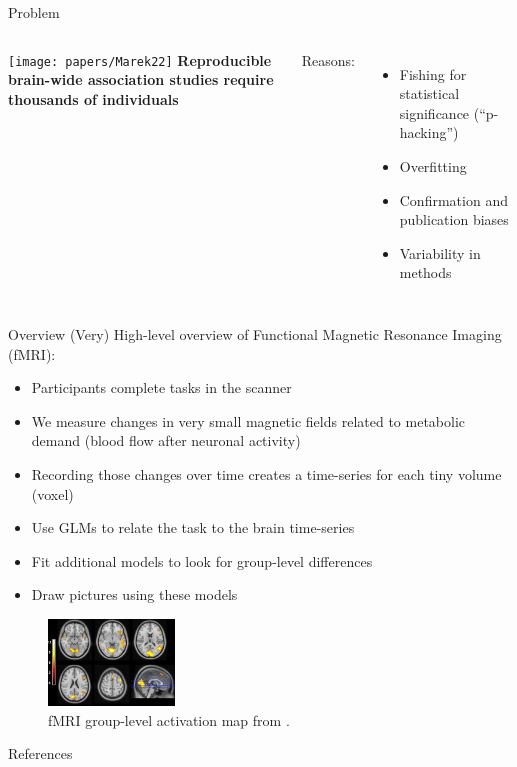 \documentclass[aspectratio=169]{beamer}
\begin{document}
\begin{frame}{Problem}
	\begin{columns}
		\texttt{[image: papers/Marek22]}
		\textbf{Reproducible brain-wide association studies require thousands of individuals \cite{MarekEtAl2022}}
		
		Reasons:
		\begin{itemize}
			\item Fishing for statistical significance (``p-hacking'') \cite{Nuzzo}
			\item Overfitting \cite{Hawkins2004}
			\item Confirmation and publication biases \cite{Bishop2020}
			\item Variability in methods \cite{Botvinik-NezerEtAl2020}
		\end{itemize}
	\end{columns}
\end{frame}


\begin{frame}{Overview}
		(Very) High-level overview of Functional Magnetic Resonance Imaging (fMRI):
		
		\begin{itemize}
			\item Participants complete tasks in the scanner
			\item We measure changes in very small magnetic fields related to metabolic demand (blood flow after neuronal activity)
			\item Recording those changes over time creates a time-series for each tiny volume (voxel)
			\item Use GLMs to relate the task to the brain time-series
			\item Fit additional models to look for group-level differences
			\item Draw pictures using these models
		\end{itemize}
		
		\begin{figure}
				\includegraphics[width=0.3\textwidth]{fmri_ex}
				\caption{fMRI group-level activation map from \cite{VassalEtAl2016}.}
		\end{figure}


\end{frame}





\begin{frame}[allowframebreaks]{References}

		\tiny
		

\end{frame}


	
	
\end{document}
